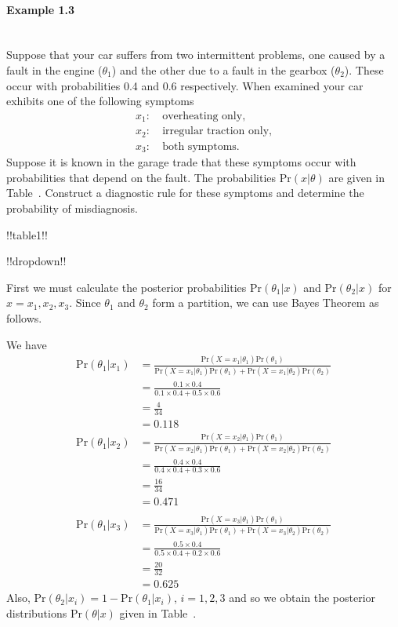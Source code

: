 \paragraph{Example 1.3}{~\\
Suppose that your car suffers from two intermittent problems, one
caused by a fault in the engine ($\theta_1$) and the other due to a
fault in the gearbox ($\theta_2$). These occur with probabilities 0.4
and 0.6 respectively. When examined your car exhibits one of the
following symptoms
\begin{align*}
x_1:&~\text{overheating only}, \\
x_2:&~\text{irregular traction only}, \\
x_3:&~\text{both symptoms}.
\end{align*}
Suppose it is known in the garage trade that these symptoms occur with
probabilities that depend on the fault. The probabilities
$\text{Pr}(x|\theta)$ are given in Table~. Construct a
diagnostic rule for these symptoms and determine the probability of
misdiagnosis.


!!table1!!




!!dropdown!!

First we must calculate the posterior probabilities $\text{Pr}(\theta_1|x)$
    and $\text{Pr}(\theta_2|x)$ for $x=x_1,x_2,x_3$. Since $\theta_1$ and
    $\theta_2$ form a partition, we can use Bayes Theorem as follows.
    
    We have
    \begin{align*}
    \text{Pr}(\theta_1|x_1)
    &=\frac{\text{Pr}(X=x_1|\theta_1)\text{Pr}(\theta_1)}
    {\text{Pr}(X=x_1|\theta_1)\text{Pr}(\theta_1)+\text{Pr}(X=x_1|\theta_2)\text{Pr}(\theta_2)} \\
    &=\frac{0.1\times 0.4}{0.1\times 0.4+0.5\times 0.6} \\
    &=\frac{4}{34} \\
    &=0.118
    \end{align*}
    \begin{align*}
    \text{Pr}(\theta_1|x_2)
    &=\frac{\text{Pr}(X=x_2|\theta_1)\text{Pr}(\theta_1)}
    {\text{Pr}(X=x_2|\theta_1)\text{Pr}(\theta_1)+\text{Pr}(X=x_2|\theta_2)\text{Pr}(\theta_2)} \\
    &=\frac{0.4\times 0.4}{0.4\times 0.4+0.3\times 0.6} \\
    &=\frac{16}{34} \\
    &=0.471 \\ \\
    \text{Pr}(\theta_1|x_3)
    &=\frac{\text{Pr}(X=x_3|\theta_1)\text{Pr}(\theta_1)}
    {\text{Pr}(X=x_3|\theta_1)\text{Pr}(\theta_1)+\text{Pr}(X=x_3|\theta_2)\text{Pr}(\theta_2)} \\
    &=\frac{0.5\times 0.4}{0.5\times 0.4+0.2\times 0.6} \\
    &=\frac{20}{32} \\
    &=0.625
    \end{align*}
    Also, $\text{Pr}(\theta_2|x_i)=1-\text{Pr}(\theta_1|x_i)$, $i=1,2,3$ and so we
    obtain the posterior distributions $\text{Pr}(\theta|x)$ given in
    Table~.

}
